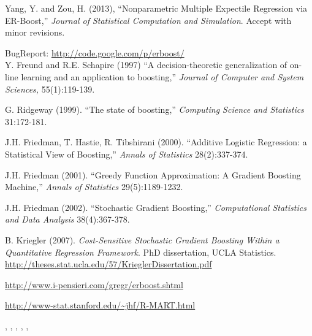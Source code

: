 \documentclass[a4paper]{book}
\begin{document}
\begin{References}\relax
Yang, Y. and Zou, H. (2013), ``Nonparametric Multiple Expectile Regression via ER-Boost,'' \emph{Journal of Statistical Computation and Simulation}. Accept with minor revisions.

BugReport: \url{http://code.google.com/p/erboost/}\\{}
Y. Freund and R.E. Schapire (1997) ``A decision-theoretic generalization of
on-line learning and an application to boosting,'' \emph{Journal of Computer and
System Sciences,} 55(1):119-139.

G. Ridgeway (1999). ``The state of boosting,'' \emph{Computing Science and
Statistics} 31:172-181.

J.H. Friedman, T. Hastie, R. Tibshirani (2000). ``Additive Logistic Regression:
a Statistical View of Boosting,'' \emph{Annals of Statistics} 28(2):337-374.

J.H. Friedman (2001). ``Greedy Function Approximation: A Gradient Boosting
Machine,'' \emph{Annals of Statistics} 29(5):1189-1232.

J.H. Friedman (2002). ``Stochastic Gradient Boosting,'' \emph{Computational Statistics
and Data Analysis} 38(4):367-378.

B. Kriegler (2007). \emph{Cost-Sensitive Stochastic Gradient Boosting Within a 
Quantitative Regression Framework}. PhD dissertation, UCLA Statistics. 
\url{http://theses.stat.ucla.edu/57/KrieglerDissertation.pdf}

\url{http://www.i-pensieri.com/gregr/erboost.shtml}

\url{http://www-stat.stanford.edu/~jhf/R-MART.html}
\end{References}
%
\begin{SeeAlso}\relax
{},
,
,
,
,
\end{SeeAlso}
%
\end{document}
